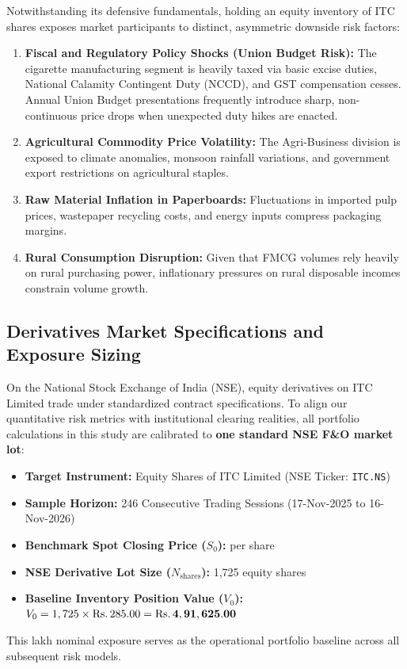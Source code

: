Notwithstanding its defensive fundamentals, holding an equity inventory of ITC shares exposes market participants to distinct, asymmetric downside risk factors:
\begin{enumerate}[leftmargin=1.5em, itemsep=1pt, parsep=0pt]
    \item \textbf{Fiscal and Regulatory Policy Shocks (Union Budget Risk):} The cigarette manufacturing segment is heavily taxed via basic excise duties, National Calamity Contingent Duty (NCCD), and GST compensation cesses. Annual Union Budget presentations frequently introduce sharp, non-continuous price drops when unexpected duty hikes are enacted.
    \item \textbf{Agricultural Commodity Price Volatility:} The Agri-Business division is exposed to climate anomalies, monsoon rainfall variations, and government export restrictions on agricultural staples.
    \item \textbf{Raw Material Inflation in Paperboards:} Fluctuations in imported pulp prices, wastepaper recycling costs, and energy inputs compress packaging margins.
    \item \textbf{Rural Consumption Disruption:} Given that FMCG volumes rely heavily on rural purchasing power, inflationary pressures on rural disposable incomes constrain volume growth.
\end{enumerate}

\subsection{Derivatives Market Specifications and Exposure Sizing}

On the National Stock Exchange of India (NSE), equity derivatives on ITC Limited trade under standardized contract specifications. To align our quantitative risk metrics with institutional clearing realities, all portfolio calculations in this study are calibrated to \textbf{one standard NSE F\&O market lot}:

\begin{formulabox}
\begin{itemize}[leftmargin=1.2em, itemsep=0.5pt, parsep=0pt]
    \item \textbf{Target Instrument:} Equity Shares of ITC Limited (NSE Ticker: \texttt{ITC.NS})
    \item \textbf{Sample Horizon:} 246 Consecutive Trading Sessions (17-Nov-2025 to 16-Nov-2026)
    \item \textbf{Benchmark Spot Closing Price ($S_0$):}  per share
    \item \textbf{NSE Derivative Lot Size ($N_{\text{shares}}$):} 1,725 equity shares
    \item \textbf{Baseline Inventory Position Value ($V_0$):} $V_0 = 1,725 \times \text{\text{Rs.}\,}285.00 = \mathbf{\text{\text{Rs.}\,}4,91,625.00}$
\end{itemize}
\end{formulabox}

This  lakh nominal exposure serves as the operational portfolio baseline across all subsequent risk models.
